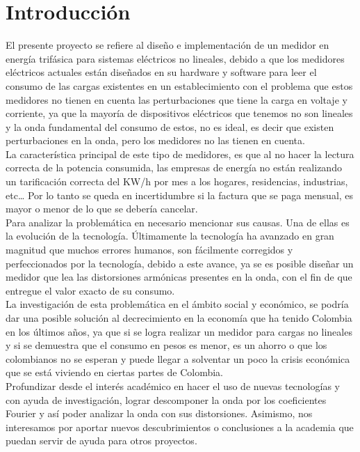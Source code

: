 \setcounter{page}{1}


\newpage{\clearpage}
\chapter{Introducción}

El presente proyecto se refiere al diseño e implementación de un medidor en energía trifásica para sistemas eléctricos no lineales, debido a que los medidores eléctricos actuales están diseñados en su hardware y software para leer el consumo de las cargas existentes en un establecimiento con el problema que estos medidores no tienen en cuenta las perturbaciones que tiene la carga en voltaje y corriente, ya que la mayoría de dispositivos eléctricos que tenemos no son lineales y la onda fundamental del consumo de estos, no es ideal, es decir que existen perturbaciones en la onda, pero los medidores no las tienen en cuenta. \\

La característica principal de este tipo de medidores, es que al no hacer la lectura correcta de la potencia consumida, las empresas de energía no están realizando un tarificación correcta del KW/h por mes a los hogares, residencias, industrias, etc… Por lo tanto se queda en incertidumbre si la factura que se paga mensual, es mayor o menor de lo que se debería cancelar.\\

Para analizar la problemática en necesario mencionar sus causas. Una de ellas es la evolución de la tecnología. Últimamente la tecnología ha avanzado en gran magnitud que muchos errores humanos, son fácilmente corregidos y perfeccionados por la tecnología, debido a este avance, ya se es posible diseñar un medidor que lea las distorsiones armónicas presentes en la onda, con el fin de que entregue el valor exacto de su consumo.\\

La investigación de esta problemática en el ámbito social y económico, se podría dar una posible solución al decrecimiento en la economía que ha tenido Colombia en los últimos años, ya que si se logra realizar un medidor para cargas no lineales y si se demuestra que el consumo en pesos es menor, es un ahorro o que los colombianos no se esperan y puede llegar a solventar un poco la crisis económica que se está viviendo en ciertas partes de Colombia.\\

Profundizar desde el interés académico en hacer el uso de nuevas tecnologías y con ayuda de investigación, lograr descomponer la onda por los coeficientes Fourier y así poder analizar la onda con sus distorsiones. Asimismo, nos interesamos por aportar nuevos descubrimientos o conclusiones a la academia que puedan servir de ayuda para otros proyectos.\\

